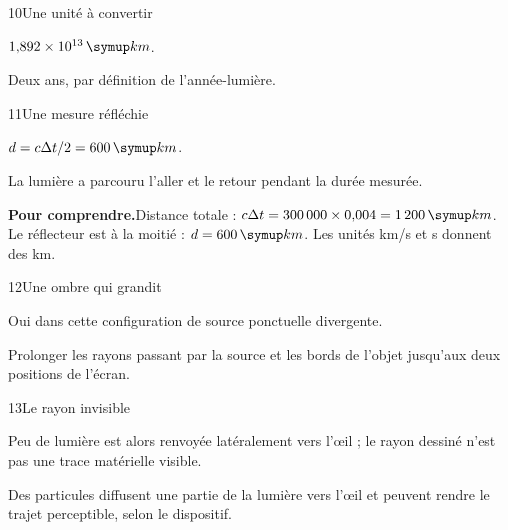 \par\noindent\begin{minipage}{\linewidth}
\begin{corrige}{10}{Une unité à convertir}
\begin{questions}
\item $1{,}892\times10^{13}\unite{km}$.
\item Deux ans, par définition de l’année-lumière.
\end{questions}
\end{corrige}
\end{minipage}
\par\noindent\begin{minipage}{\linewidth}
\begin{corrige}{11}{Une mesure réfléchie}
\begin{questions}
\item $d=c\Delta t/2=600\unite{km}$.
\item La lumière a parcouru l’aller et le retour pendant la durée mesurée.
\end{questions}
\par\smallskip\noindent\textbf{Pour comprendre.}\enspace Distance totale : $c\Delta t=300\,000\times0{,}004=1\,200\unite{km}$. Le réflecteur est à la moitié : $d=600\unite{km}$. Les unités km/s et s donnent des km.\par
{}
\end{corrige}
\end{minipage}
\par\noindent\begin{minipage}{\linewidth}
\begin{corrige}{12}{Une ombre qui grandit}
\begin{questions}
\item Oui dans cette configuration de source ponctuelle divergente.
\item Prolonger les rayons passant par la source et les bords de l’objet jusqu’aux deux positions de l’écran.
\end{questions}
\end{corrige}
\end{minipage}
\par\noindent\begin{minipage}{\linewidth}
\begin{corrige}{13}{Le rayon invisible}
\begin{questions}
\item Peu de lumière est alors renvoyée latéralement vers l’œil ; le rayon dessiné n’est pas une trace matérielle visible.
\item Des particules diffusent une partie de la lumière vers l’œil et peuvent rendre le trajet perceptible, selon le dispositif.
\end{questions}
\end{corrige}
\end{minipage}
